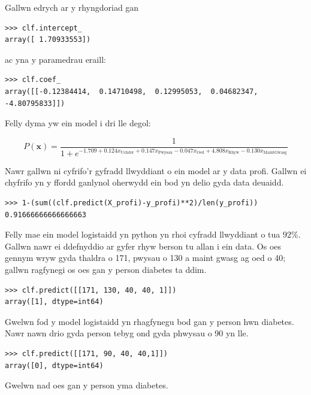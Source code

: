 Gallwn edrych ar y rhyngdoriad gan

\begin{verbatim}
>>> clf.intercept_
array([ 1.70933553])
\end{verbatim}

ac yna y paramedrau eraill:

\begin{verbatim}
>>> clf.coef_
array([[-0.12384414,  0.14710498,  0.12995053,  0.04682347, -4.80795833]])
\end{verbatim}

Felly dyma yw ein model i dri lle degol:

$$ P(\mathbf{x}) = \frac{1}{1 + e^{-1.709 + 0.124 x_{\text{Uchder}} + 0.147 x_{\text{Pwysau}} - 0.047 x_{\text{Oed}} + 4.808 x_{\text{Rhyw}} - 0.130 x_{\text{MaintGwasg}}}} $$

Nawr gallwn ni cyfrifo'r gyfradd llwyddiant o ein model ar y data profi. Gallwn ei chyfrifo yn y ffordd ganlynol oherwydd ein bod yn delio gyda data deuaidd.

\begin{verbatim}
>>> 1-(sum((clf.predict(X_profi)-y_profi)**2)/len(y_profi))
0.91666666666666663
\end{verbatim}

Felly mae ein model logistaidd yn python yn rhoi cyfradd llwyddiant o tua $92\%$. Gallwn nawr ei ddefnyddio ar gyfer rhyw berson tu allan i ein data. Os oes gennym wryw gyda thaldra o 171, pwysau o 130 a maint gwasg ag oed o 40; gallwn ragfynegi os oes gan y person diabetes ta ddim. 

\begin{verbatim}
>>> clf.predict([[171, 130, 40, 40, 1]])
array([1], dtype=int64)
\end{verbatim}

Gwelwn fod y model logistaidd yn rhagfynegu bod gan y person hwn diabetes. Nawr nawn drio gyda person tebyg ond gyda phwysau o 90 yn lle.

\begin{verbatim}
>>> clf.predict([[171, 90, 40, 40,1]])
array([0], dtype=int64)
\end{verbatim}

Gwelwn nad oes gan y person yma diabetes.